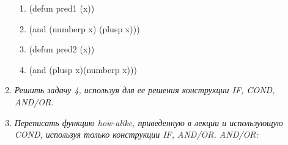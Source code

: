 \begin{enumerate}[wide=0pt]
		\begin{enumerate}[label=\arabic*)]
			\item (defun pred1 (x))
			\item (and (numberp x) (plusp x)))
			\item (defun pred2 (x))
			\item (and (plusp x)(numberp x)))
		\end{enumerate}

	\item  \textit{Решить задачу 4, используя для ее решения конструкции IF, COND,
	AND/OR.}

	\item  \textit{Переписать функцию how-alike, приведенную в лекции и использующую
	COND, используя только конструкции IF, AND/OR.
	AND/OR:}



\end{enumerate}